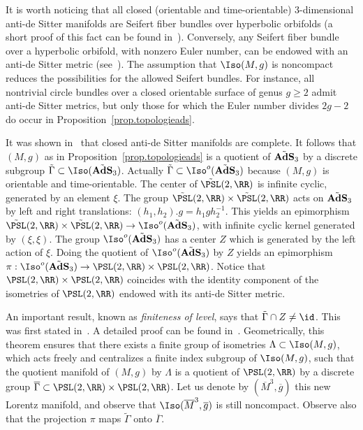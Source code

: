 It is worth noticing that all closed (orientable and time-orientable) $3$-dimensional anti-de Sitter manifolds are Seifert fiber bundles over hyperbolic orbifolds (a short proof of this fact can be found in~\cite[Corollary~4.3.6]{tholozan}). Conversely, any Seifert fiber bundle over a hyperbolic orbifold, with nonzero Euler number, can be endowed with an anti-de Sitter metric (see~\cite{scott}). The assumption that $\Iso(M,g)$ is noncompact reduces the possibilities for the allowed Seifert bundles. For instance, all nontrivial circle bundles over a closed orientable surface of genus $g \geq 2$ admit anti-de Sitter metrics, but only those for which the Euler number divides $2g-2$ do occur in Proposition~\ref{prop.topologieads}.

It was shown in~\cite{klingler} that closed anti-de Sitter manifolds are complete. It follows that $(M,g)$ as in Proposition~\ref{prop.topologieads} is a quotient of $\tilde{\bf AdS}_3$ by a discrete subgroup $\tilde{\Gamma} \subset \Iso(\tilde{\bf AdS}_3)$. Actually $\tilde{\Gamma} \subset \Iso^o(\tilde{\bf AdS}_3)$ because $(M,g)$ is orientable and time-orientable. The center of $\tilde{\PSL}(2,\RR)$ is infinite cyclic, generated by an element $\xi$. The group $\tilde{\PSL}(2,\RR) \times
\tilde{\PSL}(2,\RR)$ acts on ${\tilde{\bf AdS}_3}$ by left and right translations: $(h_1,h_2).g=h_1gh_2^{-1}$. This yields an epimorphism $\tilde{\PSL}(2,\RR) \times
\tilde{\PSL}(2,\RR) \to \Iso^o({\tilde{\bf AdS}_3})$, with infinite cyclic kernel generated by $(\xi,\xi)$. The group $\Iso^o({\tilde{\bf AdS}_3})$ has a center $Z$ which is generated by the left action of $\xi$. Doing the quotient of $\Iso^o({\tilde{\bf AdS}_3})$ by $Z$ yields an epimorphism $\pi: \Iso^o({\tilde{\bf AdS}_3}) \to \PSL(2,\RR) \times \PSL(2,\RR)$. Notice that $\PSL(2,\RR) \times \PSL(2,\RR)$ coincides with the identity component of the isometries of $\PSL(2,\RR)$ endowed with its anti-de Sitter metric.


An important result, known as \emph{finiteness of level}, says that $\tilde{\Gamma} \cap Z \not = \id$. This was first stated in~\cite{kulkarni.raymond}. A detailed proof can be found in~\cite[Theorem~3.3.2.3]{saleinthese}. Geometrically, this theorem ensures that there exists a finite group of isometries $\Lambda \subset \Iso(M,g)$, which acts freely and centralizes a finite index subgroup of $\Iso(M,g)$, such that the quotient manifold of $(M,g)$ by $\Lambda$ is a quotient of $\PSL(2,\RR)$ by a discrete group $\overline{\Gamma} \subset \PSL(2,\RR) \times \PSL(2,\RR)$. Let us denote by $(\overline{M}^3,\overline{g})$ this new Lorentz manifold, and observe that $\Iso(\overline{M}^3,\overline{g})$ is still noncompact. Observe also that the projection $\pi$ maps $\tilde{\Gamma}$ onto $\overline{\Gamma}$.

